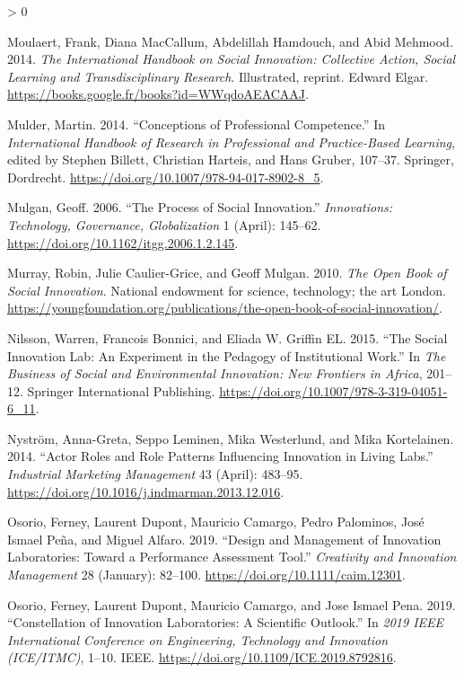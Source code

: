 \documentclass[AMA,STIX1COL,APA,STIX2COL]{WileyNJD-v2}
\newlength{\cslhangindent}
\newenvironment{CSLReferences}[2] %
 {%
  \setlength{\parindent}{0pt}
  \ifodd #1 \everypar{\setlength{\hangindent}{\cslhangindent}}\ignorespaces\fi
  \ifnum #2 > 0
  \setlength{\parskip}{#2\baselineskip}
  \fi
 }%
 {}
\begin{document}
\begin{CSLReferences}{1}{0}
\leavevmode\hypertarget{ref-Moulaert2014}{}%
Moulaert, Frank, Diana MacCallum, Abdelillah Hamdouch, and Abid Mehmood.
2014. \emph{The International Handbook on Social Innovation: Collective
Action, Social Learning and Transdisciplinary Research}. Illustrated,
reprint. Edward Elgar.
\url{https://books.google.fr/books?id=WWqdoAEACAAJ}.

\leavevmode\hypertarget{ref-Mulder2014}{}%
Mulder, Martin. 2014. {``Conceptions of Professional Competence.''} In
\emph{International Handbook of Research in Professional and
Practice-Based Learning}, edited by Stephen Billett, Christian Harteis,
and Hans Gruber, 107--37. Springer, Dordrecht.
\url{https://doi.org/10.1007/978-94-017-8902-8_5}.

\leavevmode\hypertarget{ref-Mulgan2006}{}%
Mulgan, Geoff. 2006. {``The Process of Social Innovation.''}
\emph{Innovations: Technology, Governance, Globalization} 1 (April):
145--62. \url{https://doi.org/10.1162/itgg.2006.1.2.145}.

\leavevmode\hypertarget{ref-Murray2010}{}%
Murray, Robin, Julie Caulier-Grice, and Geoff Mulgan. 2010. \emph{The
Open Book of Social Innovation}. National endowment for science,
technology; the art London.
\url{https://youngfoundation.org/publications/the-open-book-of-social-innovation/}.

\leavevmode\hypertarget{ref-Nilsson2015}{}%
Nilsson, Warren, Francois Bonnici, and Eliada W. Griffin EL. 2015.
{``The Social Innovation Lab: An Experiment in the Pedagogy of
Institutional Work.''} In \emph{The Business of Social and Environmental
Innovation: New Frontiers in Africa}, 201--12. Springer International
Publishing. \url{https://doi.org/10.1007/978-3-319-04051-6_11}.

\leavevmode\hypertarget{ref-Nystrom2014}{}%
Nyström, Anna-Greta, Seppo Leminen, Mika Westerlund, and Mika
Kortelainen. 2014. {``Actor Roles and Role Patterns Influencing
Innovation in Living Labs.''} \emph{Industrial Marketing Management} 43
(April): 483--95. \url{https://doi.org/10.1016/j.indmarman.2013.12.016}.

\leavevmode\hypertarget{ref-Osorio2019}{}%
Osorio, Ferney, Laurent Dupont, Mauricio Camargo, Pedro Palominos, José
Ismael Peña, and Miguel Alfaro. 2019. {``Design and Management of
Innovation Laboratories: Toward a Performance Assessment Tool.''}
\emph{Creativity and Innovation Management} 28 (January): 82--100.
\url{https://doi.org/10.1111/caim.12301}.

\leavevmode\hypertarget{ref-Osorio2019-A}{}%
Osorio, Ferney, Laurent Dupont, Mauricio Camargo, and Jose Ismael Pena.
2019. {``Constellation of Innovation Laboratories: A Scientific
Outlook.''} In \emph{2019 IEEE International Conference on Engineering,
Technology and Innovation (ICE/ITMC)}, 1--10. IEEE.
\url{https://doi.org/10.1109/ICE.2019.8792816}.


\end{CSLReferences}
\end{document}
